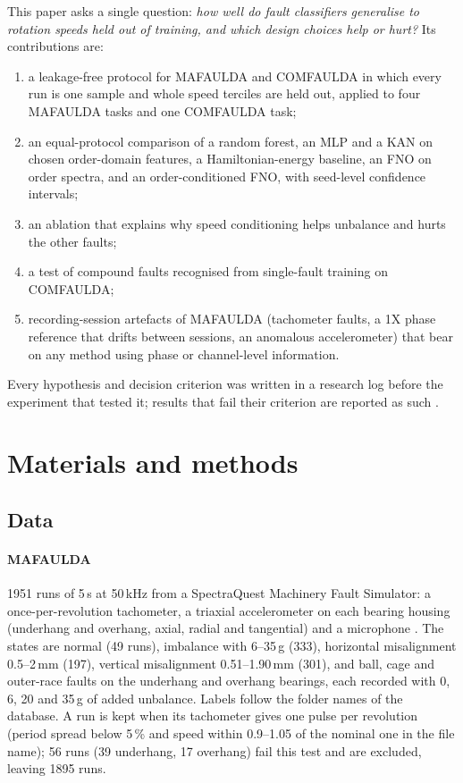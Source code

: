 \documentclass[preprint,review,12pt,authoryear=false]{elsarticle}
\begin{document}
This paper asks a single question: \emph{how well do fault classifiers generalise to rotation speeds held out of
training, and which design choices help or hurt?} Its contributions are:
\begin{enumerate}
\item a leakage-free protocol for MAFAULDA and COMFAULDA \citep{comfaulda} in which every run is one sample and whole
speed terciles are held out, applied to four MAFAULDA tasks and one COMFAULDA task;
\item an equal-protocol comparison of a random forest, an MLP and a KAN on chosen order-domain features, a
Hamiltonian-energy baseline, an FNO on order spectra, and an order-conditioned FNO, with seed-level confidence
intervals;
\item an ablation that explains why speed conditioning helps unbalance and hurts the other faults;
\item a test of compound faults recognised from single-fault training on COMFAULDA;
\item recording-session artefacts of MAFAULDA (tachometer faults, a 1X phase reference that drifts between sessions,
an anomalous accelerometer) that bear on any method using phase or channel-level information.
\end{enumerate}
Every hypothesis and decision criterion was written in a research log before the experiment that tested it; results
that fail their criterion are reported as such \citep{pinneapple}.

\section{Materials and methods}
\label{sec:methods}

\subsection{Data}

\paragraph{MAFAULDA} 1951 runs of 5\,s at 50\,kHz from a SpectraQuest Machinery Fault Simulator: a once-per-revolution
tachometer, a triaxial accelerometer on each bearing housing (underhang and overhang, axial, radial and tangential) and
a microphone \citep{mafaulda}. The states are normal (49 runs), imbalance with 6--35\,g (333), horizontal misalignment
0.5--2\,mm (197), vertical misalignment 0.51--1.90\,mm (301), and ball, cage and outer-race faults on the underhang and
overhang bearings, each recorded with 0, 6, 20 and 35\,g of added unbalance. Labels follow the folder names of the
database. A run is kept when its tachometer gives one pulse per revolution (period spread below 5\,\% and speed within
0.9--1.05 of the nominal one in the file name); 56 runs (39 underhang, 17 overhang) fail this test and are excluded,
leaving 1895 runs.
\end{document}
